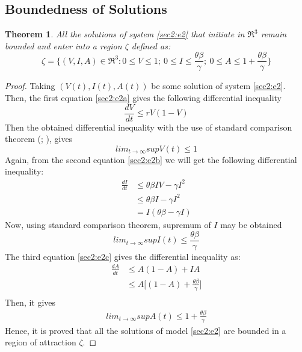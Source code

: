 \documentclass[12pt]{article}
\newtheorem{theorem}{Theorem}[section]
\numberwithin{equation}{section}
\begin{document}
\subsection{Boundedness of Solutions}
\begin{theorem} \label{Theorem 3.2}
All the solutions of system \eqref{sec2:e2} that initiate in $\Re^3$ remain bounded and enter into a region $\zeta$ defined as:\\
\begin{equation*}
\zeta=\bigg\{(V,I,A)\in \Re^3:0 \leq V\leq 1; ~0 \leq I\leq \frac{\theta \beta}{\gamma};~0\leq A\leq 1+\frac{\theta \beta}{\gamma}\bigg\}
\end{equation*}
\end{theorem}
\begin{proof}
Taking $(V(t),I(t), A(t))$ be some solution of system \eqref{sec2:e2}. Then, the first equation \eqref{sec2:e2a} gives the following differential inequality
\begin{equation}\label{sec3:e3}
\frac{dV}{dt}\leq rV(1-V)
\end{equation}
Then the obtained differential inequality with the use of standard comparison theorem (\cite{hale1969}; \cite{freedman1985}), gives
\begin{equation}\label{sec3:e4}
lim_{t\rightarrow\infty} sup V(t) \leq 1
\end{equation}
Again, from the second equation \eqref{sec2:e2b} we will get the following differential inequality:
\begin{align*}\label{sec3:e5}
\frac{dI}{dt}&\leq \theta \beta IV - \gamma I^2\\
                &\leq \theta \beta I - \gamma I^2\\
                &=I(\theta \beta - \gamma I)
\end{align*}
Now, using standard comparison theorem, supremum of $I$ may be obtained
\begin{equation}\label{sec3:e6}
lim_{t\rightarrow\infty} sup I(t) \leq \frac{\theta \beta}{\gamma}
\end{equation}
The third equation \eqref{sec2:e2c} gives the differential inequality as:
\begin{align*}
\frac{dA}{dt}&\leq A(1-A) + IA\\
             &\leq A\bigg[(1-A)+\frac{\theta \beta}{\gamma}\bigg]\\
\end{align*}
Then, it gives
\begin{align}\label{sec3:e7}
lim_{t\rightarrow\infty} sup A(t) \leq 1 + \frac{\theta \beta}{\gamma}
\end{align}
Hence, it is proved that all the solutions of model \eqref{sec2:e2} are bounded in a region of attraction $\zeta$.
\end{proof}
\end{document}
